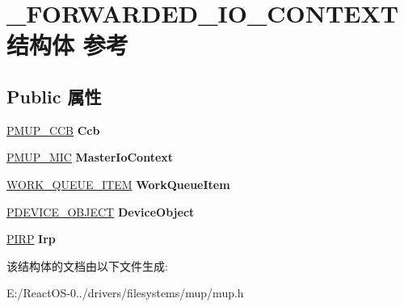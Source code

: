 \hypertarget{struct___f_o_r_w_a_r_d_e_d___i_o___c_o_n_t_e_x_t}{}\section{\+\_\+\+F\+O\+R\+W\+A\+R\+D\+E\+D\+\_\+\+I\+O\+\_\+\+C\+O\+N\+T\+E\+X\+T结构体 参考}
\label{struct___f_o_r_w_a_r_d_e_d___i_o___c_o_n_t_e_x_t}
\subsection*{Public 属性}
\begin{DoxyCompactItemize}
\item 
\mbox{\label{struct___f_o_r_w_a_r_d_e_d___i_o___c_o_n_t_e_x_t_a18829853feddaec7f771b9d20de5a1e6}} 
\hyperlink{struct___m_u_p___c_c_b}{P\+M\+U\+P\+\_\+\+C\+CB} {\bfseries Ccb}
\item 
\mbox{\label{struct___f_o_r_w_a_r_d_e_d___i_o___c_o_n_t_e_x_t_addd3fe62f74a2e8c47f5dbafebcae596}} 
\hyperlink{struct___m_u_p___m_i_c}{P\+M\+U\+P\+\_\+\+M\+IC} {\bfseries Master\+Io\+Context}
\item 
\mbox{\label{struct___f_o_r_w_a_r_d_e_d___i_o___c_o_n_t_e_x_t_ada9726583aca967330ab0ab88cf60586}} 
\hyperlink{struct___w_o_r_k___q_u_e_u_e___i_t_e_m}{W\+O\+R\+K\+\_\+\+Q\+U\+E\+U\+E\+\_\+\+I\+T\+EM} {\bfseries Work\+Queue\+Item}
\item 
\mbox{\label{struct___f_o_r_w_a_r_d_e_d___i_o___c_o_n_t_e_x_t_ae1509c4872b0b7644f6916838ecf2ab9}} 
\hyperlink{struct___d_e_v_i_c_e___o_b_j_e_c_t}{P\+D\+E\+V\+I\+C\+E\+\_\+\+O\+B\+J\+E\+CT} {\bfseries Device\+Object}
\item 
\mbox{\label{struct___f_o_r_w_a_r_d_e_d___i_o___c_o_n_t_e_x_t_a414906397c58e4d1cab1d88ceed1304a}} 
\hyperlink{interfacevoid}{P\+I\+RP} {\bfseries Irp}
\end{DoxyCompactItemize}


该结构体的文档由以下文件生成\+:\begin{DoxyCompactItemize}
\item 
E\+:/\+React\+O\+S-\/0../drivers/filesystems/mup/mup.\+h\end{DoxyCompactItemize}
